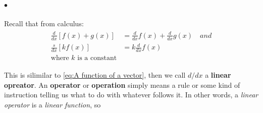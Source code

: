             \paragraph{$\bullet$} Recall that from calculus:
            \begin{align}
                \label{eq:differentiation of sum}
                \begin{aligned}
                    \frac{d}{dx}\left[ f(x) + g(x) \right] &= \frac{d}{dx}f(x) + \frac{d}{dx}g(x) \quad and\\
                    \frac{s}{dx}\left[ kf(x) \right] &= k\frac{d}{dx}f(x)\\
                    \text{where $k$ is a constant}
                \end{aligned}
            \end{align}

            This is silimilar to \eqref{eq:A function of a vector}, then we call $d/dx$ a \textbf{linear opreator}.
            An \textbf{operator} or \textbf{operation} simply means a rule or some kind of instruction telling us what 
            to do with whatever follows it. In other words, a \textit{linear operator} is a \textit{linear function}, so 
            

